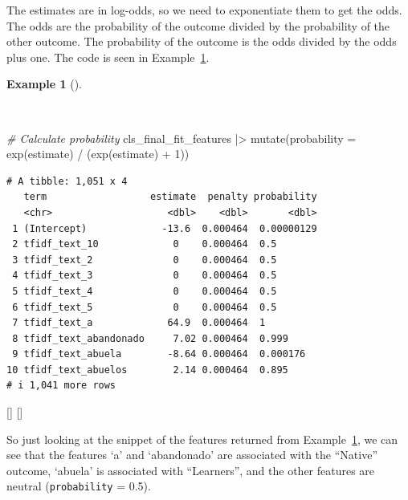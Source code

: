 \documentclass[
  letterpaper,
  krantz1]{latex/krantz-mod}
\newenvironment{Shaded}{\begin{snugshade}}{\end{snugshade}}
\newcommand{\AttributeTok}[1]{\textcolor[rgb]{0.00,0.00,0.00}{#1}}
\newcommand{\CommentTok}[1]{\textcolor[rgb]{0.00,0.00,0.00}{\textit{#1}}}
\newcommand{\DecValTok}[1]{\textcolor[rgb]{0.00,0.00,0.00}{#1}}
\newcommand{\FunctionTok}[1]{\textcolor[rgb]{0.00,0.00,0.00}{#1}}
\newcommand{\NormalTok}[1]{\textcolor[rgb]{0.00,0.00,0.00}{#1}}
\newcommand{\SpecialCharTok}[1]{\textcolor[rgb]{0.00,0.00,0.00}{#1}}
\newcommand{\cindex}[1]{%
  \StrSubstitute{#1}{_}{\_}[\temp]%
  \index{\temp}%
}
\theoremstyle{definition}
\theoremstyle{definition}
\newtheorem{example}{Example}[chapter]
\theoremstyle{remark}
\begin{document}
The estimates are in log-odds, so we need to exponentiate them to get
the odds. The odds are the probability of the outcome divided by the
probability of the other outcome. The probability of the outcome is the
odds divided by the odds plus one. The code is seen in
Example~\ref{exm-predict-class-tune-hyperparameters-evaluate-test-estimates-probability}.

\pagebreak

\begin{example}[]\protect\hypertarget{exm-predict-class-tune-hyperparameters-evaluate-test-estimates-probability}{}\label{exm-predict-class-tune-hyperparameters-evaluate-test-estimates-probability}

~

\begin{Shaded}
\begin{Highlighting}[numbers=left,,]
\CommentTok{\# Calculate probability}
\NormalTok{cls\_final\_fit\_features }\SpecialCharTok{|\textgreater{}}
  \FunctionTok{mutate}\NormalTok{(}\AttributeTok{probability =} \FunctionTok{exp}\NormalTok{(estimate) }\SpecialCharTok{/}\NormalTok{ (}\FunctionTok{exp}\NormalTok{(estimate) }\SpecialCharTok{+} \DecValTok{1}\NormalTok{))}
\end{Highlighting}
\end{Shaded}

\begin{verbatim}
# A tibble: 1,051 x 4
   term                  estimate  penalty probability
   <chr>                    <dbl>    <dbl>       <dbl>
 1 (Intercept)             -13.6  0.000464  0.00000129
 2 tfidf_text_10             0    0.000464  0.5       
 3 tfidf_text_2              0    0.000464  0.5       
 4 tfidf_text_3              0    0.000464  0.5       
 5 tfidf_text_4              0    0.000464  0.5       
 6 tfidf_text_5              0    0.000464  0.5       
 7 tfidf_text_a             64.9  0.000464  1         
 8 tfidf_text_abandonado     7.02 0.000464  0.999     
 9 tfidf_text_abuela        -8.64 0.000464  0.000176  
10 tfidf_text_abuelos        2.14 0.000464  0.895     
# i 1,041 more rows
\end{verbatim}

 \cindex{mutate()}\cindex{exp()}

\end{example}

So just looking at the snippet of the features returned from
Example~\ref{exm-predict-class-tune-hyperparameters-evaluate-test-estimates-probability},
we can see that the features `a' and `abandonado' are associated with
the ``Native'' outcome, `abuela' is associated with ``Learners'', and
the other features are neutral (\texttt{probability} = 0.5).
\end{document}
